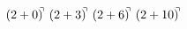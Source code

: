 \documentclass[preview]{standalone}
\begin{document}
\begin{align*}
(2+0)^{\hspace{-0.1cm}\urcorner} \ (2+3)^{\hspace{-0.1cm}\urcorner} \ (2+6)^{\hspace{-0.1cm}\urcorner} \ (2+10)^{\hspace{-0.1cm}\urcorner}
\end{align*}
\end{document}
